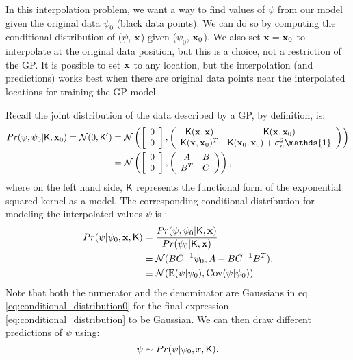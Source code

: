 In this interpolation problem, we want a way to find values of $\psi$ from our
model given the original data $\psi_0$ (black data points). We can do so by 
computing the conditional distribution of 
($\psi$, $\mathbf{x}$) given ($\psi_0$, $\mathbf{x}_0$). We also set $\mathbf{x} = \mathbf{x}_0$ to
interpolate at the original data position, but this is a choice, not a
restriction of the GP. It is possible to set $\mathbf{x}$ to any location, but the 
interpolation (and predictions) works best when there are original data points
near the interpolated locations for training the GP model.

Recall the joint distribution of the data
described by a GP, by definition, is:
\begin{align}
	Pr(\psi, \psi_0 |\kerngp, \xv_0) = \mathcal{N}(0, \kerngp') &=  \mathcal{N}\left(\left[\begin{array}{c} 0 \\ 0 \end{array} \right], 
	\left(
	\begin{array}{cc}
		\kerngp(\xv, \xv) & \kerngp(\xv, \xv_0) \\
		\kerngp(\xv, \xv_0)^T & \kerngp(\xv_0, \xv_0) + \sigma_n^2 \mathds{1}
	\end{array}
	\right)
	\right)\\
&=  \mathcal{N}\left(\left[\begin{array}{c} 0 \\ 0 \end{array} \right], 
	\left(
	\begin{array}{cc}
		A & B \\
		B^T & C 
	\end{array}
	\right)
	\right),
\end{align}
where on the left hand side, $\mathsf{K}$ represents the functional form of the
exponential squared kernel as a model.
The corresponding conditional distribution for modeling the interpolated values
$\psi$ is \citep{Rasmussen2006}:
\begin{align}
	Pr(\psi | \psi_0, \mathbf{x}, \mathsf{K}) &= \frac{Pr(\psi, \psi_0 |\mathsf{K},
	\mathbf{x})}{Pr(\psi_0 |\mathsf{K}, \mathbf{x})} \label{eq:conditional_distribution0}\\
	&= \mathcal{N}(BC^{-1}\psi_0, A -
	BC^{-1}B^T).\label{eq:conditional_distribution}\\
	& \equiv \mathcal{N}(\mathbb{E}(\psi | \psi_0), \mathrm{Cov}(\psi | \psi_0))
\end{align}
Note that both the numerator and the denominator are Gaussians in eq.
\ref{eq:conditional_distribution0} for the final expression
\ref{eq:conditional_distribution} to be Gaussian. 
We can then draw different predictions of $\psi$ using:
\begin{equation}
	\psi \sim Pr(\psi | \psi_0, x, \mathsf{K}).
\end{equation}

